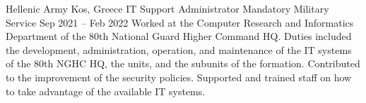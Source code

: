 
\begin{cventries}
    \cventryiv
        {Hellenic Army}
        {Kos, Greece}
        {IT Support Administrator \cvseparator Mandatory Military Service}
        {Sep 2021 -- Feb 2022}
    \cventryi
        {Worked at the Computer Research and Informatics Department of the 80th National Guard Higher Command HQ. Duties included the development, administration, operation, and maintenance of the IT systems of the 80th NGHC HQ, the units, and the subunits of the formation. Contributed to the improvement of the security policies. Supported and trained staff on how to take advantage of the available IT systems.}
\end{cventries}
